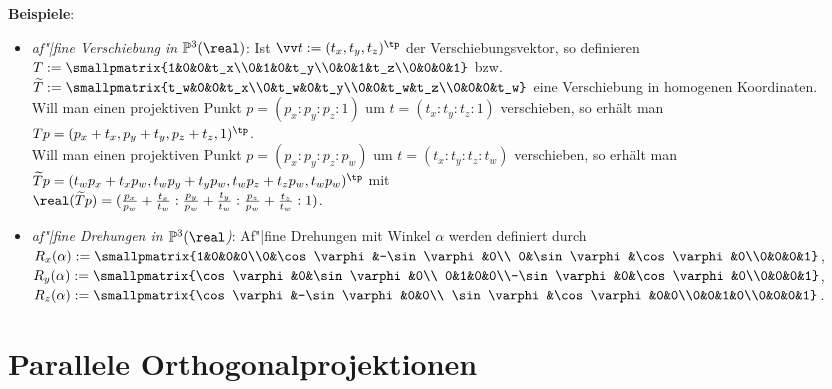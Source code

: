 \textbf{Beispiele}:
\begin{itemize}
    \item
    \emph{af"|fine Verschiebung in $\PP^3(\real)$}:
    Ist $\vec{t} := (t_x, t_y, t_z)^\tp$ der Verschiebungsvektor, so definieren
    $T := \smallpmatrix{1&0&0&t_x\\0&1&0&t_y\\0&0&1&t_z\\0&0&0&1}$ bzw.
    $\widetilde{T} := \smallpmatrix{t_w&0&0&t_x\\0&t_w&0&t_y\\0&0&t_w&t_z\\0&0&0&t_w}$
    eine Verschiebung in homogenen Koordinaten.\\
    Will man einen projektiven Punkt $p = (p_x:p_y:p_z:1)$ um $t = (t_x:t_y:t_z:1)$ verschieben,
    so erhält man $Tp = (p_x + t_x, p_y + t_y, p_z + t_z, 1)^\tp$.\\
    Will man einen projektiven Punkt $p = (p_x:p_y:p_z:p_w)$ um $t = (t_x:t_y:t_z:t_w)$
    verschieben, so erhält man $\widetilde{T}p
    = (t_w p_x + t_x p_w, t_w p_y + t_y p_w, t_w p_z + t_z p_w, t_w p_w)^\tp$ mit\\
    $\real(\widetilde{T}p) = (\frac{p_x}{p_w} + \frac{t_x}{t_w} :
    \frac{p_y}{p_w} + \frac{t_y}{t_w} : \frac{p_z}{p_w} + \frac{t_z}{t_w} : 1)$.

    \item
    \emph{af"|fine Drehungen in $\PP^3(\real$)}:
    Af"|fine Drehungen mit Winkel $\alpha$ werden definiert durch\\
    $R_x(\alpha) := \smallpmatrix{1&0&0&0\\0&\cos\varphi&-\sin\varphi&0\\
    0&\sin\varphi&\cos\varphi&0\\0&0&0&1}$,
    $R_y(\alpha) := \smallpmatrix{\cos\varphi&0&\sin\varphi&0\\
    0&1&0&0\\-\sin\varphi&0&\cos\varphi&0\\0&0&0&1}$,
    $R_z(\alpha) := \smallpmatrix{\cos\varphi&-\sin\varphi&0&0\\
    \sin\varphi&\cos\varphi&0&0\\0&0&1&0\\0&0&0&1}$.
\end{itemize}

\pagebreak

\section{%
    Parallele Orthogonalprojektionen%
}


